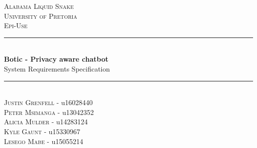 \documentclass[11pt]{article}
\begin{document}
\begin{titlepage}
	\newcommand{\HRule}{\rule{\linewidth}{0.5mm}}
    \begin{center}
            
    	\textsc{\LARGE Alabama Liquid Snake}\\[0.8cm]
    	\textsc{\Large University of Pretoria}\\[0.5cm]
    	\textsc{\large Epi-Use}\\[0.5cm]
    
    	\HRule\\[0.4cm]
    	
    	{\huge\bfseries Botic - Privacy aware chatbot}\\[0.2cm]
    	
    	{\huge System Requirements Specification}\\[0.2cm]

    	\HRule\\[0.5cm]

	    \textsc{Justin Grenfell} - u16028440 \\[0cm]
	    \textsc{Peter Msimanga} - u13042352 \\[0cm]
	    \textsc{Alicia Mulder} - u14283124 \\[0cm]
	    \textsc{Kyle Gaunt} - u15330967 \\[0cm]
	    \textsc{Lesego Mabe} - u15055214 \\[0cm]
    
    \end{center}
\end{titlepage}
\tableofcontents
\newpage
\end{document}
